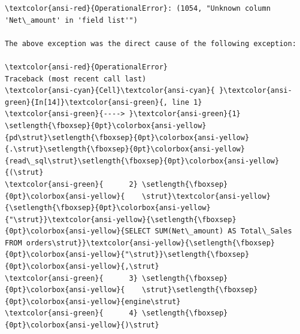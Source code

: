 \documentclass[11pt]{article}
\begin{document}
\begin{Verbatim}[commandchars=\\\{\}, frame=single, framerule=2mm, rulecolor=\color{outerrorbackground}]
\textcolor{ansi-red}{OperationalError}: (1054, "Unknown column 'Net\_amount' in 'field list'")

The above exception was the direct cause of the following exception:

\textcolor{ansi-red}{OperationalError}                          Traceback (most recent call last)
\textcolor{ansi-cyan}{Cell}\textcolor{ansi-cyan}{ }\textcolor{ansi-green}{In[14]}\textcolor{ansi-green}{, line 1}
\textcolor{ansi-green}{----> }\textcolor{ansi-green}{1} \setlength{\fboxsep}{0pt}\colorbox{ansi-yellow}{pd\strut}\setlength{\fboxsep}{0pt}\colorbox{ansi-yellow}{.\strut}\setlength{\fboxsep}{0pt}\colorbox{ansi-yellow}{read\_sql\strut}\setlength{\fboxsep}{0pt}\colorbox{ansi-yellow}{(\strut}
\textcolor{ansi-green}{      2} \setlength{\fboxsep}{0pt}\colorbox{ansi-yellow}{    \strut}\textcolor{ansi-yellow}{\setlength{\fboxsep}{0pt}\colorbox{ansi-yellow}{"\strut}}\textcolor{ansi-yellow}{\setlength{\fboxsep}{0pt}\colorbox{ansi-yellow}{SELECT SUM(Net\_amount) AS Total\_Sales FROM orders\strut}}\textcolor{ansi-yellow}{\setlength{\fboxsep}{0pt}\colorbox{ansi-yellow}{"\strut}}\setlength{\fboxsep}{0pt}\colorbox{ansi-yellow}{,\strut}
\textcolor{ansi-green}{      3} \setlength{\fboxsep}{0pt}\colorbox{ansi-yellow}{    \strut}\setlength{\fboxsep}{0pt}\colorbox{ansi-yellow}{engine\strut}
\textcolor{ansi-green}{      4} \setlength{\fboxsep}{0pt}\colorbox{ansi-yellow}{)\strut}


\end{Verbatim}
\end{document}
